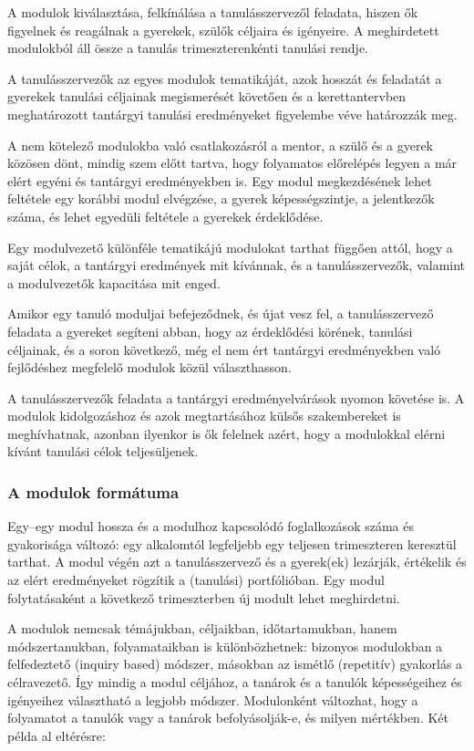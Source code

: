 A modulok kiválasztása, felkínálása a tanulásszervezől feladata,
hiszen ők figyelnek és reagálnak a gyerekek, szülők céljaira és igényeire. A
meghirdetett modulokból áll össze a tanulás trimeszterenkénti tanulási rendje.

A tanulásszervezők az egyes modulok tematikáját, azok hosszát és feladatát a
gyerekek tanulási céljainak megismerését követően és a kerettantervben
meghatározott tantárgyi tanulási eredményeket figyelembe véve határozzák meg.

A nem kötelező modulokba való csatlakozásról a mentor, a szülő és a gyerek
közösen dönt,
mindig szem előtt tartva, hogy folyamatos előrelépés legyen a már elért egyéni
és tantárgyi eredményekben is. Egy modul megkezdésének lehet feltétele egy
korábbi modul elvégzése, a gyerek képességszintje, a jelentkezők száma, és
lehet egyedüli feltétele a gyerekek érdeklődése.

Egy modulvezető különféle tematikájú modulokat tarthat függően attól, hogy a
saját célok, a tantárgyi eredmények mit kívánnak, és a tanulásszervezők,
valamint a modulvezetők kapacitása mit enged.

Amikor egy tanuló moduljai befejeződnek, és újat vesz fel, a tanulásszervező
feladata a gyereket segíteni abban, hogy az érdeklődési körének, tanulási
céljainak, és a soron következő, még el nem ért tantárgyi eredményekben való
fejlődéshez megfelelő modulok közül választhasson.

A tanulásszervezők feladata a tantárgyi eredményelvárások nyomon követése is. A
modulok kidolgozáshoz és azok megtartásához külsős szakembereket is
meghívhatnak, azonban ilyenkor is ők felelnek azért, hogy a modulokkal elérni
kívánt tanulási célok teljesüljenek.

\subsubsection{A modulok formátuma}

Egy--egy modul hossza és a modulhoz kapcsolódó foglalkozások száma és
gyakorisága változó: egy alkalomtól legfeljebb egy teljesen trimeszteren
keresztül tarthat. A modul végén azt a tanulásszervező és a gyerek(ek)
lezárják, értékelik és az elért eredményeket rögzítik a (tanulási)
portfólióban. Egy modul folytatásaként a következő trimeszterben új modult
lehet meghirdetni.

A modulok nemcsak témájukban, céljaikban, időtartamukban, hanem
módszertanukban, folyamataikban is különbözhetnek: bizonyos modulokban a
felfedeztető (inquiry based) módszer, másokban az ismétlő (repetitív)
gyakorlás a célravezető. Így mindig a modul céljához, a tanárok és a
tanulók képességeihez és igényeihez választható a legjobb módszer.
Modulonként változhat, hogy a folyamatot a tanulók vagy a tanárok
befolyásolják-e, és milyen mértékben. Két példa al eltérésre:

